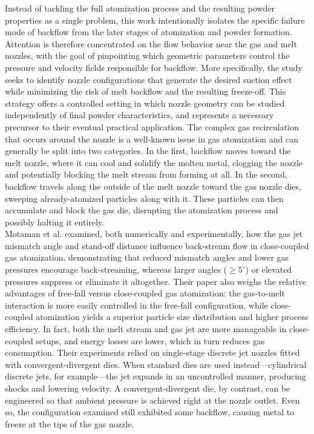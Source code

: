 \documentclass[../../../main.tex]{subfiles}
\begin{document}
Instead of tackling the full atomization process and the resulting powder properties as a single problem, this work intentionally isolates the specific failure mode of backflow from the later stages of atomization and powder formation. Attention is therefore concentrated on the flow behavior near the gas and melt nozzles, with the goal of pinpointing which geometric parameters control the pressure and velocity fields responsible for backflow. More specifically, the study seeks to identify nozzle configurations that generate the desired suction effect while minimizing the risk of melt backflow and the resulting freeze-off. This strategy offers a controlled setting in which nozzle geometry can be studied independently of final powder characteristics, and represents a necessary precursor to their eventual practical application. The complex gas recirculation that occurs around the nozzle is a well-known issue in gas atomization and can generally be split into two categories. In the first, backflow moves toward the melt nozzle, where it can cool and solidify the molten metal, clogging the nozzle and potentially blocking the melt stream from forming at all. In the second, backflow travels along the outside of the melt nozzle toward the gas nozzle dies, sweeping already-atomized particles along with it. These particles can then accumulate and block the gas die, disrupting the atomization process and possibly halting it entirely.\\
Motaman et al. \cite{Motaman2013NumericalExperimental} examined, both numerically and experimentally, how the gas jet mismatch angle and stand-off distance influence back-stream flow in close-coupled gas atomization, demonstrating that reduced mismatch angles and lower gas pressures encourage back-streaming, whereas larger angles ($\geq 5^\circ$) or elevated pressures suppress or eliminate it altogether. Their paper also weighs the relative advantages of free-fall versus close-coupled gas atomization: the gas-to-melt interaction is more easily controlled in the free-fall configuration, while close-coupled atomization yields a superior particle size distribution and higher process efficiency. In fact, both the melt stream and gas jet are more manageable in close-coupled setups, and energy losses are lower, which in turn reduces gas consumption. Their experiments relied on single-stage discrete jet nozzles fitted with convergent-divergent dies. When standard dies are used instead—cylindrical discrete jets, for example—the jet expands in an uncontrolled manner, producing shocks and lowering velocity. A convergent-divergent die, by contrast, can be engineered so that ambient pressure is achieved right at the nozzle outlet. Even so, the configuration examined still exhibited some backflow, causing metal to freeze at the tips of the gas nozzle.
\end{document}

